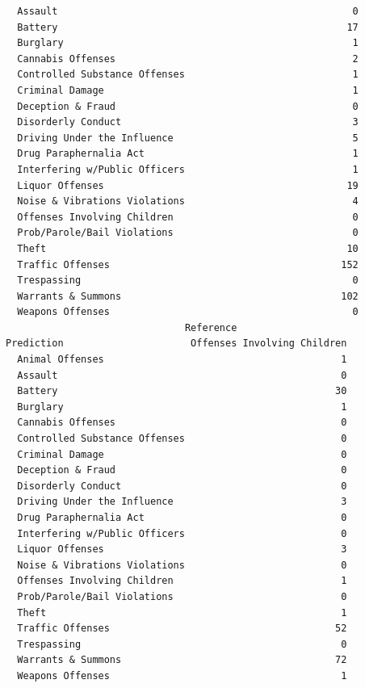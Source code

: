 \documentclass[
  article]{jss}
\begin{document}
\begin{verbatim}
  Assault                                                   0
  Battery                                                  17
  Burglary                                                  1
  Cannabis Offenses                                         2
  Controlled Substance Offenses                             1
  Criminal Damage                                           1
  Deception & Fraud                                         0
  Disorderly Conduct                                        3
  Driving Under the Influence                               5
  Drug Paraphernalia Act                                    1
  Interfering w/Public Officers                             1
  Liquor Offenses                                          19
  Noise & Vibrations Violations                             4
  Offenses Involving Children                               0
  Prob/Parole/Bail Violations                               0
  Theft                                                    10
  Traffic Offenses                                        152
  Trespassing                                               0
  Warrants & Summons                                      102
  Weapons Offenses                                          0
                               Reference
Prediction                      Offenses Involving Children
  Animal Offenses                                         1
  Assault                                                 0
  Battery                                                30
  Burglary                                                1
  Cannabis Offenses                                       0
  Controlled Substance Offenses                           0
  Criminal Damage                                         0
  Deception & Fraud                                       0
  Disorderly Conduct                                      0
  Driving Under the Influence                             3
  Drug Paraphernalia Act                                  0
  Interfering w/Public Officers                           0
  Liquor Offenses                                         3
  Noise & Vibrations Violations                           0
  Offenses Involving Children                             1
  Prob/Parole/Bail Violations                             0
  Theft                                                   1
  Traffic Offenses                                       52
  Trespassing                                             0
  Warrants & Summons                                     72
  Weapons Offenses                                        1

\end{verbatim}
\end{document}
